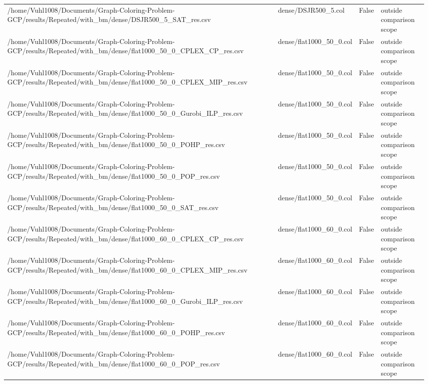 \begin{table}[htbp]
\begin{tabular}{llll}
/home/Vuhl1008/Documents/Graph-Coloring-Problem-GCP/results/Repeated/with\_bm/dense/DSJR500\_5\_SAT\_res.csv & dense/DSJR500\_5.col & False & outside comparison scope \\
/home/Vuhl1008/Documents/Graph-Coloring-Problem-GCP/results/Repeated/with\_bm/dense/flat1000\_50\_0\_CPLEX\_CP\_res.csv & dense/flat1000\_50\_0.col & False & outside comparison scope \\
/home/Vuhl1008/Documents/Graph-Coloring-Problem-GCP/results/Repeated/with\_bm/dense/flat1000\_50\_0\_CPLEX\_MIP\_res.csv & dense/flat1000\_50\_0.col & False & outside comparison scope \\
/home/Vuhl1008/Documents/Graph-Coloring-Problem-GCP/results/Repeated/with\_bm/dense/flat1000\_50\_0\_Gurobi\_ILP\_res.csv & dense/flat1000\_50\_0.col & False & outside comparison scope \\
/home/Vuhl1008/Documents/Graph-Coloring-Problem-GCP/results/Repeated/with\_bm/dense/flat1000\_50\_0\_POHP\_res.csv & dense/flat1000\_50\_0.col & False & outside comparison scope \\
/home/Vuhl1008/Documents/Graph-Coloring-Problem-GCP/results/Repeated/with\_bm/dense/flat1000\_50\_0\_POP\_res.csv & dense/flat1000\_50\_0.col & False & outside comparison scope \\
/home/Vuhl1008/Documents/Graph-Coloring-Problem-GCP/results/Repeated/with\_bm/dense/flat1000\_50\_0\_SAT\_res.csv & dense/flat1000\_50\_0.col & False & outside comparison scope \\
/home/Vuhl1008/Documents/Graph-Coloring-Problem-GCP/results/Repeated/with\_bm/dense/flat1000\_60\_0\_CPLEX\_CP\_res.csv & dense/flat1000\_60\_0.col & False & outside comparison scope \\
/home/Vuhl1008/Documents/Graph-Coloring-Problem-GCP/results/Repeated/with\_bm/dense/flat1000\_60\_0\_CPLEX\_MIP\_res.csv & dense/flat1000\_60\_0.col & False & outside comparison scope \\
/home/Vuhl1008/Documents/Graph-Coloring-Problem-GCP/results/Repeated/with\_bm/dense/flat1000\_60\_0\_Gurobi\_ILP\_res.csv & dense/flat1000\_60\_0.col & False & outside comparison scope \\
/home/Vuhl1008/Documents/Graph-Coloring-Problem-GCP/results/Repeated/with\_bm/dense/flat1000\_60\_0\_POHP\_res.csv & dense/flat1000\_60\_0.col & False & outside comparison scope \\
/home/Vuhl1008/Documents/Graph-Coloring-Problem-GCP/results/Repeated/with\_bm/dense/flat1000\_60\_0\_POP\_res.csv & dense/flat1000\_60\_0.col & False & outside comparison scope \\

\end{tabular}
\end{table}
